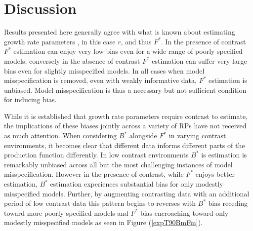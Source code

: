 \documentclass[12pt]{article}
\begin{document}
\clearpage
\section{Discussion}

%
Results presented here generally agree with what is known about estimating 
growth rate parameters , 
in this case $r$, and thus $F^*$.  
In the presence of contrast $F^*$ estimation can enjoy very low bias even 
for a wide range of poorly specified models; conversely in the absence of 
contrast $F^*$ estimation can suffer very large bias even for slightly 
misspecified models. In all cases when model misspecification is removed, even 
with weakly informative data, $F^*$ estimation is unbiased.  Model 
misspecification is thus a necessary but not sufficient condition for inducing 
bias. 



While it is established that growth rate parameters require contrast to estimate, 
the implications of these biases jointly across a variety of RPs have not 
received as much attention. 
When considering $B^*$ alongside $F^*$ in varying contrast environments, it 
becomes clear that different data informs different parts of the production 
function differently. In low contrast environments $B^*$ is estimation is 
remarkably unbiased across all but the most challenging instances of model 
misspecification. However in the presence of contrast, while $F^*$ enjoys 
better estimation, $B^*$ estimation experiences substantial bias for only 
modestly misspecified models. Further, by augmenting contrasting data with an 
additional period of low contrast data this pattern begins to reverses with $B^*$ 
bias receding toward more poorly specified models and $F^*$ bias encroaching 
toward only modestly misspecified models as seen in Figure (\ref{expT90BmFm}).   
\end{document}
